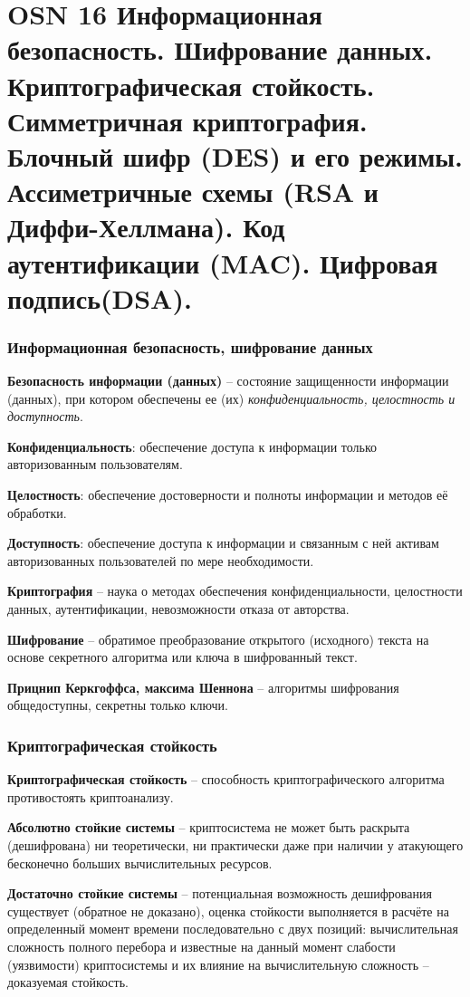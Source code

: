 \section*{OSN 16 Информационная безопасность. Шифрование данных. Криптографическая стойкость. Симметричная криптография. Блочный шифр (DES) и его режимы. Ассиметричные схемы (RSA и Диффи-Хеллмана). Код аутентификации (MAC). Цифровая подпись(DSA).}

\subsubsection{Информационная безопасность, шифрование данных}

\textbf{Безопасность информации (данных)} -- состояние защищенности информации (данных), при котором обеспечены ее (их) \textit{конфиденциальность, целостность и доступность}.

\textbf{Конфиденциальность}: обеспечение доступа к информации только авторизованным пользователям.

\textbf{Целостность}: обеспечение достоверности и полноты информации и методов её обработки.

\textbf{Доступность}: обеспечение доступа к информации и связанным с ней активам авторизованных пользователей по мере необходимости.

\textbf{Криптография} -- наука о методах обеспечения конфиденциальности, целостности данных, аутентификации, невозможности отказа от авторства.

\textbf{Шифрование} -- обратимое преобразование открытого (исходного) текста на основе секретного алгоритма или ключа в шифрованный текст.

\textbf{Прицнип Керкгоффса, максима Шеннона} -- алгоритмы шифрования общедоступны, секретны только ключи.

\subsubsection{Криптографическая стойкость}

\textbf{Криптографическая стойкость} -- способность криптографического алгоритма противостоять криптоанализу.

\textbf{Абсолютно стойкие системы} -- криптосистема не может быть раскрыта (дешифрована) ни теоретически, ни практически даже при наличии у атакующего бесконечно больших вычислительных ресурсов.

\textbf{Достаточно стойкие системы} -- потенциальная возможность дешифрования существует (обратное не доказано), оценка стойкости выполняется в расчёте на определенный момент времени последовательно с двух позиций: вычислительная сложность полного перебора и известные на данный момент слабости (уязвимости) криптосистемы и их влияние на вычислительную сложность -- доказуемая стойкость.

